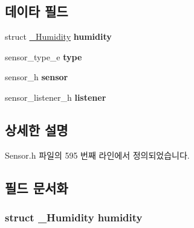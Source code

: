 \subsection*{데이타 필드}
\begin{DoxyCompactItemize}
\item 
\hypertarget{struct___humidity_extend_aeae7c9d5a8189e24f5e832b83559896f}{struct \hyperlink{struct___humidity}{\-\_\-\-Humidity} {\bfseries humidity}}\label{struct___humidity_extend_aeae7c9d5a8189e24f5e832b83559896f}

\item 
\hypertarget{struct___humidity_extend_abffb09766da2fc510a79bb51f82a36e1}{sensor\-\_\-type\-\_\-e {\bfseries type}}\label{struct___humidity_extend_abffb09766da2fc510a79bb51f82a36e1}

\item 
\hypertarget{struct___humidity_extend_a5bae9b7801bc3808411925cde81d3f26}{sensor\-\_\-h {\bfseries sensor}}\label{struct___humidity_extend_a5bae9b7801bc3808411925cde81d3f26}

\item 
\hypertarget{struct___humidity_extend_aa977dfb866b24fd7d9a20a9a01b2fd1f}{sensor\-\_\-listener\-\_\-h {\bfseries listener}}\label{struct___humidity_extend_aa977dfb866b24fd7d9a20a9a01b2fd1f}

\end{DoxyCompactItemize}


\subsection{상세한 설명}


Sensor.\-h 파일의 595 번째 라인에서 정의되었습니다.



\subsection{필드 문서화}
\hypertarget{struct___humidity_extend_aeae7c9d5a8189e24f5e832b83559896f}{
\subsubsection[{humidity}]{\setlength{\rightskip}{0pt plus 5cm}struct {\bf \-\_\-\-Humidity} humidity}}\label{struct___humidity_extend_aeae7c9d5a8189e24f5e832b83559896f}


